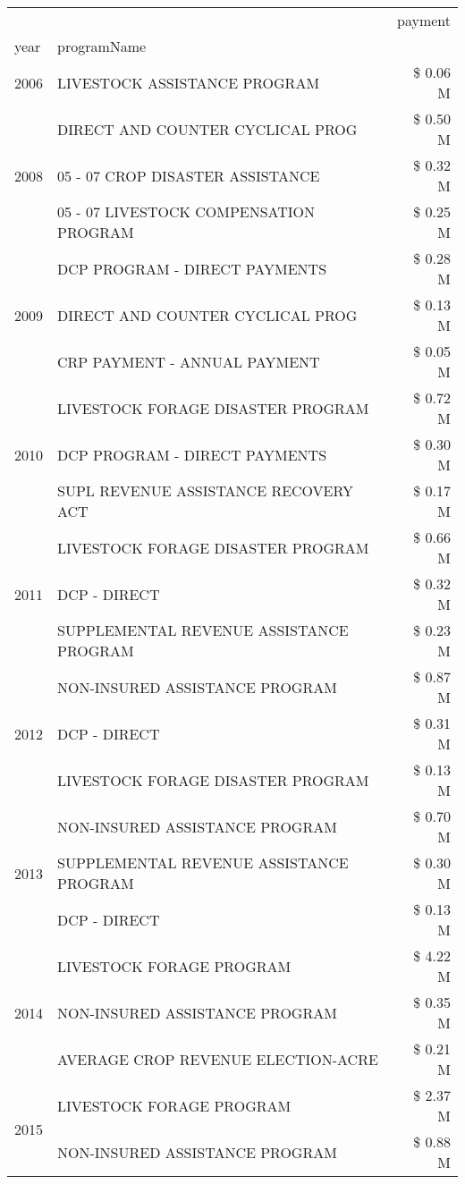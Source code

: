 \begin{tabular}{llr}
\toprule
 &  & payment \\
year & programName &  \\
\midrule
2006 & LIVESTOCK ASSISTANCE PROGRAM & \$ 0.06 M \\
\cline{1-3}
\multirow[t]{3}{*}{2008} & DIRECT AND COUNTER CYCLICAL PROG & \$ 0.50 M \\
 & 05 - 07 CROP DISASTER ASSISTANCE & \$ 0.32 M \\
 & 05 - 07 LIVESTOCK COMPENSATION PROGRAM & \$ 0.25 M \\
\cline{1-3}
\multirow[t]{3}{*}{2009} & DCP PROGRAM - DIRECT PAYMENTS & \$ 0.28 M \\
 & DIRECT AND COUNTER CYCLICAL PROG & \$ 0.13 M \\
 & CRP PAYMENT - ANNUAL PAYMENT & \$ 0.05 M \\
\cline{1-3}
\multirow[t]{3}{*}{2010} & LIVESTOCK FORAGE DISASTER  PROGRAM & \$ 0.72 M \\
 & DCP PROGRAM - DIRECT PAYMENTS & \$ 0.30 M \\
 & SUPL REVENUE ASSISTANCE RECOVERY ACT & \$ 0.17 M \\
\cline{1-3}
\multirow[t]{3}{*}{2011} & LIVESTOCK FORAGE DISASTER PROGRAM & \$ 0.66 M \\
 & DCP - DIRECT & \$ 0.32 M \\
 & SUPPLEMENTAL REVENUE ASSISTANCE PROGRAM & \$ 0.23 M \\
\cline{1-3}
\multirow[t]{3}{*}{2012} & NON-INSURED ASSISTANCE PROGRAM & \$ 0.87 M \\
 & DCP - DIRECT & \$ 0.31 M \\
 & LIVESTOCK FORAGE DISASTER PROGRAM & \$ 0.13 M \\
\cline{1-3}
\multirow[t]{3}{*}{2013} & NON-INSURED ASSISTANCE PROGRAM & \$ 0.70 M \\
 & SUPPLEMENTAL REVENUE ASSISTANCE PROGRAM & \$ 0.30 M \\
 & DCP - DIRECT & \$ 0.13 M \\
\cline{1-3}
\multirow[t]{3}{*}{2014} & LIVESTOCK FORAGE PROGRAM & \$ 4.22 M \\
 & NON-INSURED ASSISTANCE PROGRAM & \$ 0.35 M \\
 & AVERAGE CROP REVENUE ELECTION-ACRE & \$ 0.21 M \\
\cline{1-3}
\multirow[t]{3}{*}{2015} & LIVESTOCK FORAGE PROGRAM & \$ 2.37 M \\
 & NON-INSURED ASSISTANCE PROGRAM & \$ 0.88 M \\

\end{tabular}
